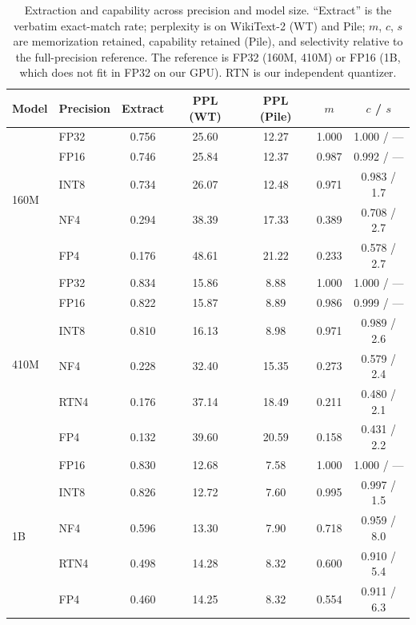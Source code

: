 \documentclass{article}
\begin{document}
\begin{table}[t]
  \caption{Extraction and capability across precision and model size.
  ``Extract'' is the verbatim exact-match rate; perplexity is on WikiText-2
  (WT) and Pile; $m$, $c$, $s$ are memorization retained, capability retained
  (Pile), and selectivity relative to the full-precision reference. The
  reference is FP32 (160M, 410M) or FP16 (1B, which does not fit in FP32 on
  our GPU). RTN is our independent quantizer.}
  \label{tab:main}
  \centering
  \small
  \begin{tabular}{llccccc}
    \toprule
    Model & Precision & Extract & PPL (WT) & PPL (Pile) & $m$ & $c$ / $s$ \\
    \midrule
    \multirow{5}{*}{160M}
      & FP32 & 0.756 & 25.60 & 12.27 & 1.000 & 1.000 / --- \\
      & FP16 & 0.746 & 25.84 & 12.37 & 0.987 & 0.992 / --- \\
      & INT8 & 0.734 & 26.07 & 12.48 & 0.971 & 0.983 / 1.7 \\
      & NF4  & 0.294 & 38.39 & 17.33 & 0.389 & 0.708 / 2.7 \\
      & FP4  & 0.176 & 48.61 & 21.22 & 0.233 & 0.578 / 2.7 \\
    \midrule
    \multirow{6}{*}{410M}
      & FP32 & 0.834 & 15.86 & 8.88 & 1.000 & 1.000 / --- \\
      & FP16 & 0.822 & 15.87 & 8.89 & 0.986 & 0.999 / --- \\
      & INT8 & 0.810 & 16.13 & 8.98 & 0.971 & 0.989 / 2.6 \\
      & NF4  & 0.228 & 32.40 & 15.35 & 0.273 & 0.579 / 2.4 \\
      & RTN4 & 0.176 & 37.14 & 18.49 & 0.211 & 0.480 / 2.1 \\
      & FP4  & 0.132 & 39.60 & 20.59 & 0.158 & 0.431 / 2.2 \\
    \midrule
    \multirow{5}{*}{1B}
      & FP16 & 0.830 & 12.68 & 7.58 & 1.000 & 1.000 / --- \\
      & INT8 & 0.826 & 12.72 & 7.60 & 0.995 & 0.997 / 1.5 \\
      & NF4  & 0.596 & 13.30 & 7.90 & 0.718 & 0.959 / 8.0 \\
      & RTN4 & 0.498 & 14.28 & 8.32 & 0.600 & 0.910 / 5.4 \\
      & FP4  & 0.460 & 14.25 & 8.32 & 0.554 & 0.911 / 6.3 \\
    \bottomrule
  \end{tabular}
\end{table}
\end{document}
